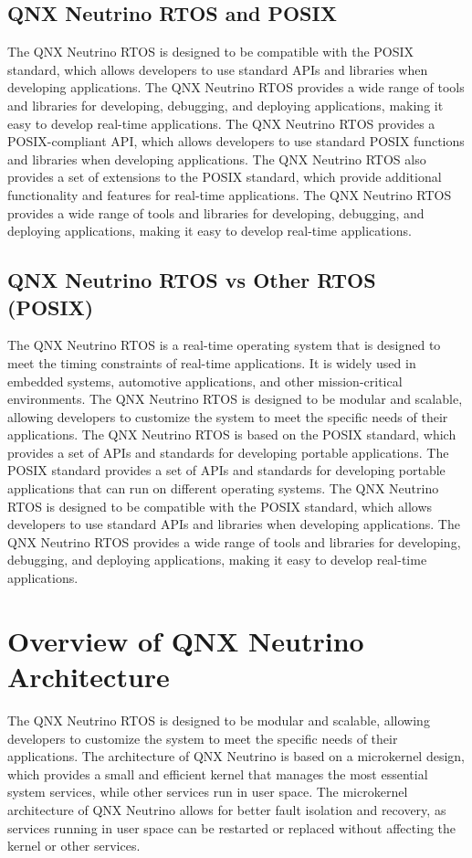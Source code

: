 \documentclass{article}
\begin{document}
\subsection{QNX Neutrino RTOS and POSIX}
\label{sec:qnx-neutrino-posix}
The QNX Neutrino RTOS is designed to be compatible with the POSIX standard, which allows developers to use standard APIs and libraries when developing applications.
The QNX Neutrino RTOS provides a wide range of tools and libraries for developing, debugging, and deploying applications, making it easy to develop real-time applications.
The QNX Neutrino RTOS provides a POSIX-compliant API, which allows developers to use standard POSIX functions and libraries when developing applications.
The QNX Neutrino RTOS also provides a set of extensions to the POSIX standard, which provide additional functionality and features for real-time applications.
The QNX Neutrino RTOS provides a wide range of tools and libraries for developing, debugging, and deploying applications, making it easy to develop real-time applications.

\subsection{QNX Neutrino RTOS vs Other RTOS (POSIX)}
\label{sec:qnx-neutrino-vs-other-rtos}
The QNX Neutrino RTOS is a real-time operating system that is designed to meet the timing constraints of real-time applications.
It is widely used in embedded systems, automotive applications, and other mission-critical environments.
The QNX Neutrino RTOS is designed to be modular and scalable, allowing developers to customize the system to meet the specific needs of their applications.
The QNX Neutrino RTOS is based on the POSIX standard, which provides a set of APIs and standards for developing portable applications.
The POSIX standard provides a set of APIs and standards for developing portable applications that can run on different operating systems.
The QNX Neutrino RTOS is designed to be compatible with the POSIX standard, which allows developers to use standard APIs and libraries when developing applications.
The QNX Neutrino RTOS provides a wide range of tools and libraries for developing, debugging, and deploying applications, making it easy to develop real-time applications.

\FloatBarrier
\section{Overview of QNX Neutrino Architecture}
\label{sec:qnx-neutrino-architecture}
The QNX Neutrino RTOS is designed to be modular and scalable, allowing developers to customize the system to meet the specific needs of their applications.
The architecture of QNX Neutrino is based on a microkernel design, which provides a small and efficient kernel that manages the most essential system services, while other services run in user space.
The microkernel architecture of QNX Neutrino allows for better fault isolation and recovery, as services running in user space can be restarted or replaced without affecting the kernel or other services.
\FloatBarrier
\end{document}
